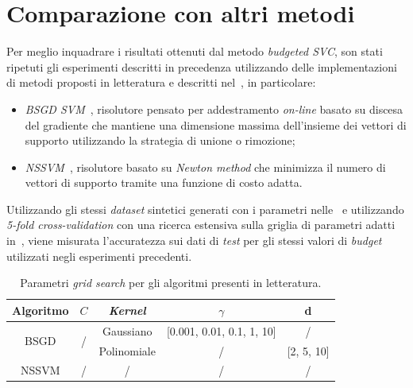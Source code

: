 \section{Comparazione con altri metodi}\label{sec:comparazione_metodi}
Per meglio inquadrare i risultati ottenuti dal metodo \emph{budgeted SVC}, son stati ripetuti gli esperimenti descritti in precedenza utilizzando delle implementazioni di metodi proposti in letteratura e descritti nel~, in particolare:
\begin{itemize}
    \item \emph{BSGD SVM}~\cite{2012_bsgd}, risolutore pensato per addestramento \emph{on-line} basato su discesa del gradiente che mantiene una dimensione massima dell'insieme dei vettori di supporto utilizzando la strategia di unione o rimozione;
    \item \emph{NSSVM}~\cite{2020_sparse_svm}, risolutore basato su \emph{Newton method} che minimizza il numero di vettori di supporto tramite una funzione di costo adatta.
\end{itemize}
Utilizzando gli stessi \emph{dataset} sintetici generati con i parametri nelle~ e utilizzando \emph{5-fold cross-validation} con una ricerca estensiva sulla griglia di parametri adatti in~, viene misurata l'accuratezza sui dati di \emph{test} per gli stessi valori di \emph{budget} utilizzati negli esperimenti precedenti.
\begin{table}
    \centering
    \begin{tabular}{ccccc}
        \toprule
        Algoritmo & $C$ & \emph{Kernel} & $\gamma$ & d \\
        \midrule
        \multirow{2}{*}{BSGD}   & \multirow{2}{*}{/}  & Gaussiano   & [0.001, 0.01, 0.1, 1, 10]   & /\\
                                      \cline{3-5}
                                &   & Polinomiale & / & [2, 5, 10] \\
        \hline
        NSSVM   & / & / & / & / \\
        \bottomrule
    \end{tabular}
    \caption{Parametri \emph{grid search} per gli algoritmi presenti in letteratura.}
    \label{tab:gridsearch_comparazioni}
\end{table}

